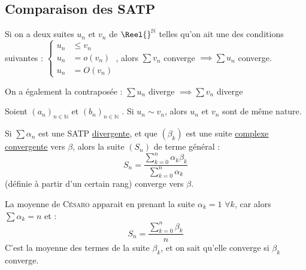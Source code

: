 \documentclass[11pt,a4paper,fleqn,pdftex]{report}
\begin{document}
\subsection{Comparaison des \gls{SATP}} %
\label{sub:comparaison_des_satp}
\begin{itheorem}
    Si on a deux suites $u_n$ et $v_n$ de $\Reel{}^\mathbb{N}$ telles qu'on ait une des conditions suivantes : $
    \left\lbrace
    \begin{aligned}
        u_n &\le v_n    \\
        u_n &= o(v_n)   \\
        u_n &= O(v_n)
    \end{aligned}
    \right. $, alors $\sum v_n$ converge $\implies \sum u_n$ converge. \par

    On a également la contraposée : 
    $\sum u_n$ diverge $\implies \sum v_n$ diverge
\end{itheorem}
\begin{itheorem}
     Soient $(a_n)_{n\in \mathbb{N}}$ et $(b_n)_{n\in \mathbb{N}}$ . \newline
     Si $u_n \sim v_n$, alors $u_n$ et $v_n$ sont de même nature.
\end{itheorem}
\needspace{7cm}
\begin{theorem}
    Si $\sum \alpha_n$ est une \gls{SATP} \uline{divergente}, et que $(\beta_k)$ est une suite \uline{complexe convergente} vers $\beta$, alors la suite $(S_n)$ de terme général : 
    \[
        S_n = \dfrac{\displaystyle \sum_{k=0}^n \alpha_k \beta_k}{\displaystyle \sum_{k=0}^n \alpha_k}
    \]
    (définie à partir d'un certain rang) converge vers $\beta$.\par
    La moyenne de \textsc{Césaro} apparait en prenant la suite $\alpha_k = 1$ $\forall k$, car alors $\sum \alpha_k = n$ et : 
    \[
        S_n = \dfrac{\displaystyle \sum_{k=0}^n \beta_k}{n}
    \]
    C'est la moyenne des termes de la suite $\beta_k$, et on sait qu'elle converge si $\beta_k$ converge.
\end{theorem}
\end{document}
